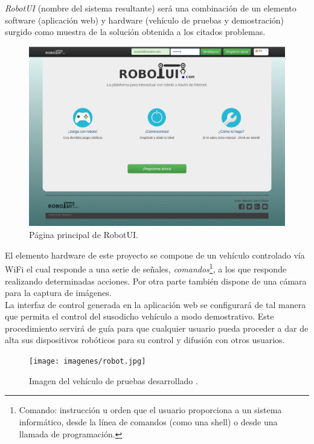 \emph{RobotUI} (nombre del sistema resultante) será una combinación de un elemento software (aplicación web) y hardware (vehículo de pruebas y demostración) surgido como muestra de la solución obtenida a los citados problemas.\\



\begin{figure}[H]
  \begin{center}
    \includegraphics[scale=0.3]{imagenes/manual-usuario/pagina-principal.png}
  \end{center}
  \label{fig:logo}
 \caption{Página principal de RobotUI.}
\end{figure}


El elemento hardware de este proyecto se compone de un vehículo controlado vía WiFi el cual responde a una serie de señales, \emph{comandos}\footnote{ Comando: instrucción u orden que el usuario proporciona a un sistema informático, 
desde la línea de comandos (como una shell) o desde una llamada de programación.}, a los que responde realizando determinadas acciones. Por otra parte también dispone de una cámara para la captura de imágenes.\\

La interfaz de control generada en la aplicación web se configurará de tal manera que permita el control del susodicho vehículo a modo demostrativo. Este procedimiento servirá de guía para que cualquier usuario pueda proceder a dar de alta sus dispositivos 
robóticos para su control y difusión con otros usuarios.\\

\begin{figure}[H]
  \begin{center}
    \texttt{[image: imagenes/robot.jpg]}
  \end{center}
  \label{fig:logo}
 \caption{Imagen del vehículo de pruebas desarrollado \protect\footnotemark.}
\end{figure}

